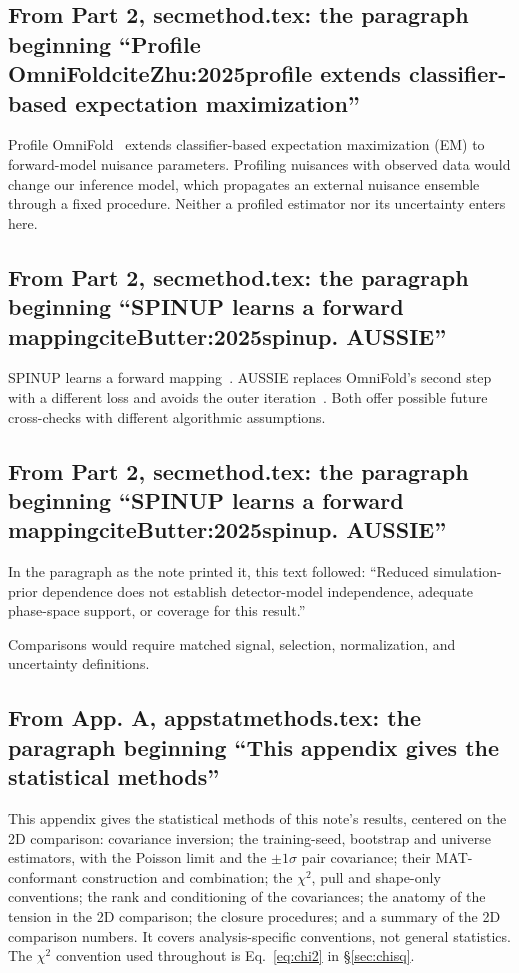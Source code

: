 \subsection{From Part 2, secmethod.tex: the paragraph beginning ``Profile OmniFoldciteZhu:2025profile extends classifier-based expectation maximization''}
Profile OmniFold~\cite{Zhu:2025profile} extends classifier-based expectation maximization (EM) to forward-model nuisance parameters. Profiling nuisances with observed data would change our inference model, which propagates an external nuisance ensemble through a fixed procedure. Neither a profiled estimator nor its uncertainty enters here.

\subsection{From Part 2, secmethod.tex: the paragraph beginning ``SPINUP learns a forward mappingciteButter:2025spinup. AUSSIE''}
SPINUP learns a forward mapping~\cite{Butter:2025spinup}. AUSSIE replaces OmniFold's second step with a different loss and avoids the outer iteration~\cite{Ore:2026aussie}. Both offer possible future cross-checks with different algorithmic assumptions.

\subsection{From Part 2, secmethod.tex: the paragraph beginning ``SPINUP learns a forward mappingciteButter:2025spinup. AUSSIE''}
In the paragraph as the note printed it, this text followed: ``Reduced simulation-prior dependence does not establish detector-model independence, adequate phase-space support, or coverage for this result.''\par
Comparisons would require matched signal, selection, normalization, and uncertainty definitions.

\subsection{From App. A, appstatmethods.tex: the paragraph beginning ``This appendix gives the statistical methods''}
This appendix gives the statistical methods of this note's results, centered on the 2D comparison: covariance inversion; the training-seed, bootstrap and universe estimators, with the Poisson limit and the $\pm1\sigma$ pair covariance; their MAT-conformant construction and combination; the $\chi^{2}$, pull and shape-only conventions; the rank and conditioning of the covariances; the anatomy of the tension in the 2D comparison; the closure procedures; and a summary of the 2D comparison numbers. It covers analysis-specific conventions, not general statistics. The $\chi^{2}$ convention used throughout is Eq.~\eqref{eq:chi2} in \S\ref{sec:chisq}.

